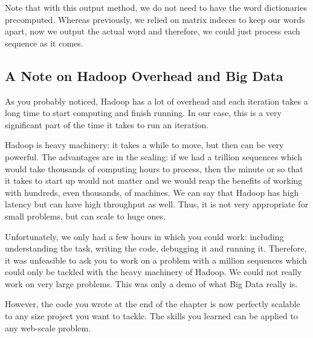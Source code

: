 Note that with this output method, we do not need to have the word dictionaries
precomputed. Whereas previously, we relied on matrix indeces to keep our words
apart, now we output the actual word and therefore, we could just process each
sequence as it comes.

\subsection{A Note on Hadoop Overhead and Big Data}

As you probably noticed, Hadoop has a lot of overhead and each iteration takes
a long time to start computing and finish running. In our case, this is a very
significant part of the time it takes to run an iteration.

Hadoop is heavy machinery: it takes a while to move, but then can be very
powerful. The advantages are in the scaling: if we had a trillion sequences which
would take thousands of computing hours to process, then the minute or so that
it takes to start up would not matter and we would reap the benefits of working
with hundreds, even thousands, of machines. We can say that Hadoop has high
latency but can have high throughput as well. Thus, it is not very appropriate
for small problems, but can scale to huge ones.

Unfortunately, we only had a few hours in which you could work: including
understanding the task, writing the code, debugging it and running it.
Therefore, it was unfeasible to ask you to work on a problem with a million
sequences which could only be tackled with the heavy machinery of Hadoop.
We could not really work on very large problems. This was only a demo of what
Big Data really is.

However, the code you wrote at the end of the chapter is now perfectly scalable
to any size project you want to tackle. The skills you learned can be applied
to any web-scale problem.

